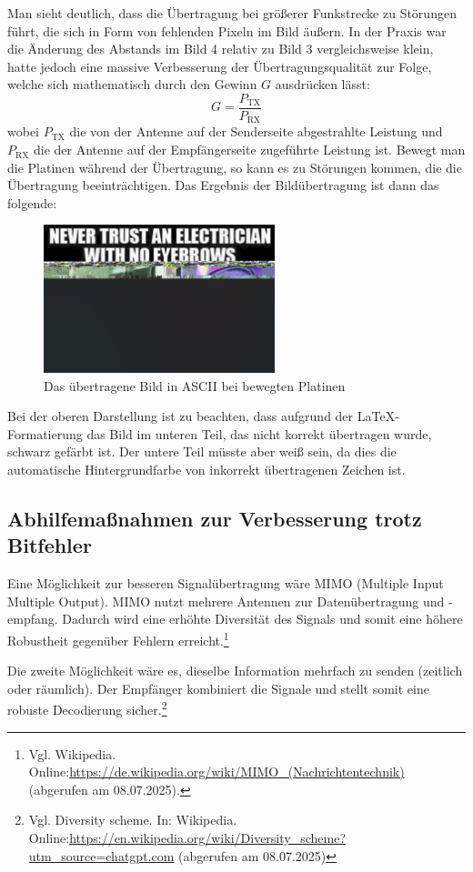 Man sieht deutlich, dass die Übertragung bei größerer Funkstrecke zu Störungen führt, die sich in Form von fehlenden Pixeln im Bild äußern. 
In der Praxis war die Änderung des Abstands im Bild 4 relativ zu Bild 3 vergleichsweise klein, hatte jedoch eine massive Verbesserung der Übertragungsqualität zur Folge, 
welche sich mathematisch durch den Gewinn $G$ ausdrücken lässt: 
\begin{equation}
    G = \frac{P_\text{TX}}{P_\text{RX}}
\end{equation}
wobei $P_\text{TX}$ die von der Antenne auf der Senderseite abgestrahlte Leistung und $P_\text{RX}$ die der Antenne auf der Empfängerseite zugeführte Leistung ist.
\clearpage
Bewegt man die Platinen während der Übertragung, so kann es zu Störungen kommen, die die Übertragung beeinträchtigen. Das Ergebnis der Bildübertragung ist dann das folgende:
\begin{figure}[H]
    \centering
    \includegraphics[width=0.6\textwidth]{Pictures/memeASCIIbewegt.jpg}
    \caption{Das übertragene Bild in ASCII bei bewegten Platinen}
    \label{fig:Task2e}
\end{figure}
Bei der oberen Darstellung ist zu beachten, dass aufgrund der LaTeX-Formatierung das Bild im unteren Teil, das nicht korrekt übertragen wurde, schwarz gefärbt ist. Der untere Teil müsste aber weiß sein, da dies die automatische Hintergrundfarbe von inkorrekt übertragenen Zeichen ist. 

\subsection{Abhilfemaßnahmen zur Verbesserung trotz Bitfehler}
Eine Möglichkeit zur besseren Signalübertragung wäre MIMO (Multiple Input Multiple Output). MIMO nutzt mehrere Antennen zur Datenübertragung und -empfang. Dadurch wird eine erhöhte Diversität des Signals und somit eine höhere Robustheit gegenüber Fehlern erreicht.\footnote{Vgl. Wikipedia. Online:\url{https://de.wikipedia.org/wiki/MIMO_(Nachrichtentechnik)} (abgerufen am 08.07.2025).}

Die zweite Möglichkeit wäre es, dieselbe Information mehrfach zu senden (zeitlich oder räumlich). Der Empfänger kombiniert die Signale und stellt somit eine robuste Decodierung sicher.\footnote{Vgl. Diversity scheme. In: Wikipedia. Online:\url{https://en.wikipedia.org/wiki/Diversity_scheme?utm_source=chatgpt.com} (abgerufen am 08.07.2025)}
